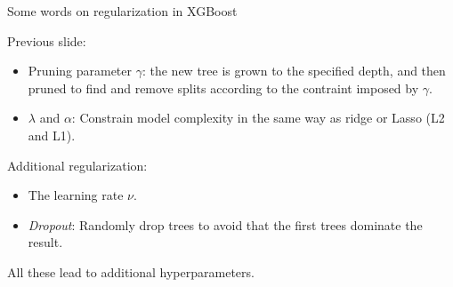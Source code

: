 \documentclass[
  10pt,
  ignorenonframetext,
]{beamer}
\providecommand{\tightlist}{%
  \setlength{\itemsep}{0pt}\setlength{\parskip}{0pt}}
\begin{document}
\begin{frame}
\begin{block}{Some words on regularization in XGBoost}
\label{some-words-on-regularization-in-xgboost}
\(~\)

Previous slide:

\vspace{2mm}

\begin{itemize}
\tightlist
\item
  Pruning parameter \(\gamma\): the new tree is grown to the specified
  depth, and then pruned to find and remove splits according to the
  contraint imposed by \(\gamma\).
\end{itemize}

\vspace{2mm}

\begin{itemize}
\tightlist
\item
  \(\lambda\) and \(\alpha\): Constrain model complexity in the same way
  as ridge or Lasso (L2 and L1).
\end{itemize}

\vspace{4mm}

Additional regularization:

\vspace{2mm}

\begin{itemize}
\tightlist
\item
  The learning rate \(\nu\).
\end{itemize}

\vspace{3mm}

\begin{itemize}
\tightlist
\item
  \emph{Dropout}: Randomly drop trees to avoid that the first trees
  dominate the result.
\end{itemize}

\vspace{3mm}

All these lead to additional hyperparameters.
\end{block}
\end{frame}
\end{document}
